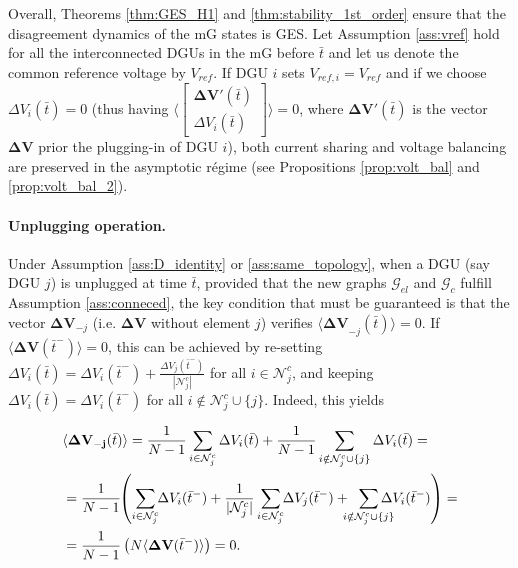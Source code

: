 \documentclass[a4paper]{article}
\theoremstyle{plain}
\begin{document}
Overall, Theorems \ref{thm:GES_H1} and
\ref{thm:stability_1st_order} ensure that the disagreement dynamics of
the mG states is GES.
Let Assumption \ref{ass:vref}
hold for all the interconnected DGUs in the mG before $\bar t$ and let
us denote the common reference voltage by $V_{ref}$. If DGU $i$ sets
$V_{ref,i} = V_{ref}$ and if we choose $\Delta V_i(\bar t) = 0$ (thus having $\langle\left[ \begin{array}{c}
\mathbf{\Delta V'}(\bar t) \\
\Delta V_i (\bar t)
\end{array}\right]\rangle= 0$, where $\mathbf{\Delta V'}(\bar t)$ is the
vector $\mathbf{\Delta V}$ prior the plugging-in of DGU $i$), both current sharing and
voltage balancing are preserved in the asymptotic r\'{e}gime (see Propositions
\ref{prop:volt_bal} and \ref{prop:volt_bal_2}). 

\paragraph{Unplugging operation.} Under Assumption \ref{ass:D_identity} or \ref{ass:same_topology}, when a DGU (say DGU $j$) is
unplugged at time $\bar t$, provided that the new graphs $\mathcal{G}_{el}$ and $\mathcal{G}_c$ fulfill Assumption \ref{ass:conneced}, the key condition that must
be guaranteed is that the vector $\mathbf{\Delta V}_{-j}$
(i.e. $\mathbf{\Delta V}$ without element $j$) verifies
$\mathbf{\langle\Delta V}_{-j}(\bar t)\rangle=0$. If $\mathbf{\langle\Delta
	V}(\bar t^-)\rangle=0$, this can be achieved by re-setting $\Delta
V_i(\bar t)=\Delta V_i(\bar t^-)+\frac{\Delta V_j(\bar
	t^-)}{|\mathcal{N}_j^c|}$ for all $i\in\mathcal{N}_j^c$, and keeping $\Delta V_i(\bar t)=\Delta V_i(\bar
t^-)$ for all $i \notin\mathcal{N}_{j}^c\cup \{j\}$. Indeed, this yields

\begin{equation*}
\begin{aligned}
&\mathbf{\langle\Delta V_{-j}}(\bar t)\rangle
=\frac{1}{N-1}\sum\limits_{i\in\mathcal{N}_j^c}\Delta V_i(\bar
t)+\frac{1}{N-1}\sum\limits_{i\notin\mathcal{N}_j^c\cup\{j\}}\Delta V_i(\bar
t)=\\
&=\frac{1}{N-1}\hspace{-1mm}\left(\sum\limits_{i\in\mathcal{N}_{j}^c}\hspace{-1mm}\Delta V_i(\bar
t^-) +\frac{1}{|\mathcal{N}_{j}^c|}\sum\limits_{i\in\mathcal{N}_{j}^c}\hspace{-1mm}\Delta V_j(\bar
t^-)+ \hspace{-2mm}\sum\limits_{i\notin\mathcal{N}_j^c\cup\{j\}}\hspace{-4mm}\Delta V_i(\bar t^-) \right)=\\
&=\frac{1}{N-1}\left(N \mathbf{\langle\Delta V}(\bar t^-)\rangle\right)=0.
\end{aligned}
\end{equation*}
\end{document}
